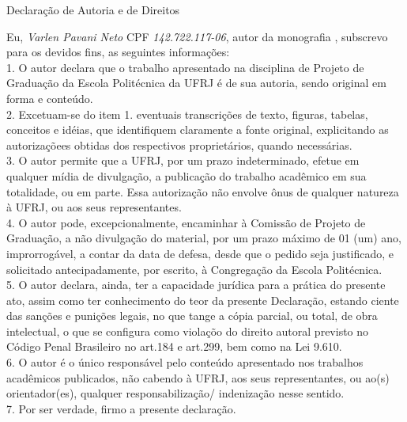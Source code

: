 \begin{center}
Declaração de Autoria e de Direitos
\end{center}

\vspace{0.5cm}

Eu, \emph{Varlen Pavani Neto} CPF \emph{142.722.117-06}, autor da monografia \emph{\titulo{}}, subscrevo para os devidos fins, as seguintes informações:\\
1. O autor declara que o trabalho apresentado na disciplina de Projeto de Graduação da Escola Politécnica da UFRJ é de sua autoria, sendo original em forma e conteúdo.\\
2. Excetuam-se do item 1. eventuais transcrições de texto, figuras, tabelas, conceitos e idéias, que identifiquem claramente a fonte original, explicitando as autorizaçõees obtidas dos respectivos proprietários, quando necessárias.\\
3. O autor permite que a UFRJ, por um prazo indeterminado, efetue em qualquer mídia de divulgação, a publicação do trabalho acadêmico em sua totalidade, ou em parte. Essa autorização não envolve ônus de qualquer natureza à UFRJ, ou aos seus representantes.\\
4. O autor pode, excepcionalmente, encaminhar à Comissão de Projeto de Graduação, a não divulgação do material, por um prazo máximo de 01 (um) ano, improrrogável, a contar da data de defesa, desde que o pedido seja justificado, e solicitado antecipadamente, por escrito, à Congregação da Escola Politécnica.\\
5. O autor declara, ainda, ter a capacidade jurídica para a prática do presente ato, assim como ter conhecimento do teor da presente Declaração, estando ciente das sanções e punições legais, no que tange a cópia parcial, ou total, de obra intelectual, o que se configura como violaçõo do direito autoral previsto no Código Penal Brasileiro no art.184 e art.299, bem como na Lei 9.610.\\
6. O autor é o único responsável pelo conteúdo apresentado nos trabalhos acadêmicos publicados, não cabendo à UFRJ, aos seus representantes,  ou ao(s) orientador(es), qualquer responsabilização/ indenização nesse sentido.\\
7. Por ser verdade, firmo a presente declaração.\\

      \vspace{0.5cm}
      \begin{flushright}
         \parbox{10cm}{
            \hrulefill

            \vspace{-.375cm}

            \vspace{0.1cm}
         }
      \end{flushright}
      
